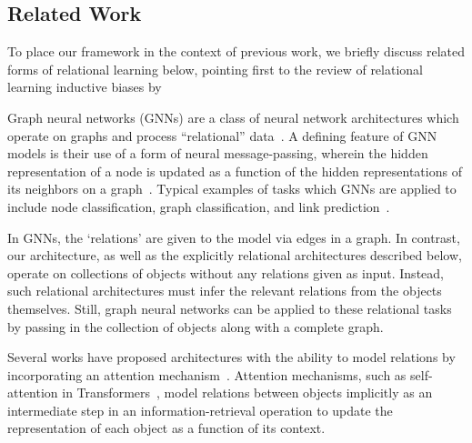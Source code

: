\subsection{Related Work}\label{ssec:related_work}

To place our framework in the context of previous work, we briefly discuss related forms of relational learning below, pointing first to the review of relational learning inductive biases by~\cite{battagliaRelationalInductiveBiases2018}%

{Graph neural networks} (GNNs) are a class of neural network architectures which operate on graphs and process ``relational'' data~\citep[e.g.,][]{niepertLearningConvolutionalNeural2016,kipfSemiSupervisedClassificationGraph2017,schlichtkrullModelingRelationalData2017,velickovicGraphAttentionNetworks2017,kipfNeuralRelationalInference2018,xuHowPowerfulAre2018}. A defining feature of GNN models is their use of a form of neural message-passing, wherein the hidden representation of a node is updated as a function of the hidden representations of its neighbors on a graph~\cite{gilmerNeuralMessagePassing2017}. Typical examples of tasks which GNNs are applied to include node classification, graph classification, and link prediction~\cite{hamiltonGraphRepresentationLearning2020}. %

In GNNs, the `relations' are given to the model via edges in a graph. In contrast, our architecture, as well as the explicitly relational architectures described below, operate on collections of objects without any relations given as input. Instead, such relational architectures must infer the relevant relations from the objects themselves. Still, graph neural networks can be applied to these relational tasks by passing in the collection of objects along with a complete graph. %

Several works have proposed architectures with the ability to model relations by incorporating an {attention mechanism}~\citep[e.g.,][]{vaswani2017attention,velickovicGraphAttentionNetworks2017,santoroRelationalRecurrent2018,zambaldiDeepReinforcementLearning2018,locatelloObjectCentricLearningSlot2020}. Attention mechanisms, such as self-attention in Transformers~\cite{vaswani2017attention}, model relations between objects implicitly as an intermediate step in an information-retrieval operation
to update the representation of each object as a function of its context.

